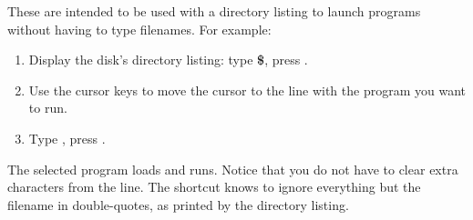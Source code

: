 These are intended to be used with a directory listing to launch programs without having to type filenames. For example:

\begin{enumerate}
\item Display the disk's directory listing: type {\bf \$}, press .
\item Use the cursor keys to move the cursor to the line with the program you want to run.
\item Type {\bf \screentext{$\uparrow$}}, press .
\end{enumerate}

The selected program loads and runs. Notice that you do not have to clear extra characters from the line. The shortcut knows to ignore everything but the filename in double-quotes, as printed by the directory listing.
